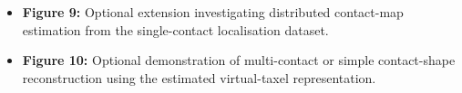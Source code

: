 \begin{itemize}
\item \textbf{Figure 9:} Optional extension investigating distributed
contact-map estimation from the single-contact localisation dataset.

\item \textbf{Figure 10:} Optional demonstration of multi-contact or simple
contact-shape reconstruction using the estimated virtual-taxel
representation.


\end{itemize}
